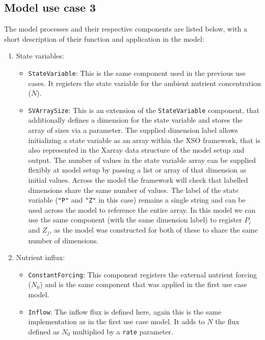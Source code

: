 \documentclass[journal abbreviation, manuscript]{copernicus}
\begin{document}
\subsection{Model use case 3} \label{Appendix:Implementation3}
The model processes and their respective components are listed below, with a short description of their function and application in the model:

\begin{enumerate}
    \item State variables: 
    \begin{itemize}
        \item \texttt{StateVariable}: This is the same component used in the previous use cases. It registers the state variable for the ambient nutrient concentration ($N$). 
        \item \texttt{SVArraySize}: This is an extension of the \texttt{StateVariable} component, that additionally defines a dimension for the state variable and stores the array of sizes via a parameter. The supplied dimension label allows initializing a state variable as an array within the XSO framework, that is also represented in the Xarray data structure of the model setup and output. The number of values in the state variable array can be supplied flexibly at model setup by passing a list or array of that dimension as initial values. Across the model the framework will check that labelled dimensions share the same number of values. The label of the state variable (\texttt{"P"} and \texttt{"Z"} in this case) remains a single string and can be used across the model to reference the entire array. In this model we can use the same component (with the same dimension label) to register $P_i$ and $Z_j$, as the model was constructed for both of these to share the same number of dimensions.
    \end{itemize}

    \item Nutrient influx: 
    \begin{itemize}
        \item \texttt{ConstantForcing}: This component registers the external nutrient forcing ($N_0$) and is the same component that was applied in the first use case model.
        \item \texttt{Inflow}: The inflow flux is defined here, again this is the same implementation as in the first use case model. It adds to $N$ the flux defined as $N_0$ multiplied by a \texttt{rate} parameter. 
    \end{itemize}
    

\end{enumerate}
\end{document}
